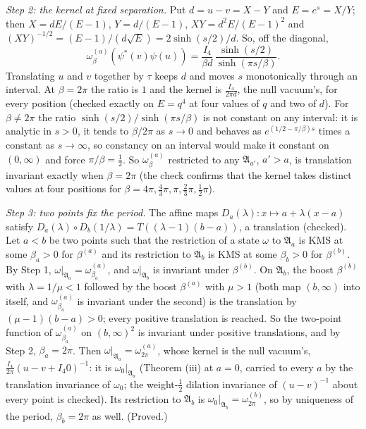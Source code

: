\emph{Step 2: the kernel at fixed separation.} Put $d = u - v = X - Y$ and $E = e^{s} = X/Y$; then $X = dE/(E - 1)$, $Y = d/(E - 1)$, $XY = d^{2}E/(E - 1)^{2}$ and $(XY)^{-1/2} = (E - 1)/(d\sqrt{E}) = 2\sinh(s/2)/d$. So, off the diagonal,
\[
\omega^{(a)}_{\beta}(\psi^{*}(v)\psi(u)) = \frac{I_{4}}{\beta d}\,\frac{\sinh(s/2)}{\sinh(\pi s/\beta)}.
\]
Translating $u$ and $v$ together by $\tau$ keeps $d$ and moves $s$ monotonically through an interval. At $\beta = 2\pi$ the ratio is $1$ and the kernel is $\tfrac{I_{4}}{2\pi d}$, the null vacuum's, for every position (checked exactly on $E = q^{4}$ at four values of $q$ and two of $d$). For $\beta \ne 2\pi$ the ratio $\sinh(s/2)/\sinh(\pi s/\beta)$ is not constant on any interval: it is analytic in $s > 0$, it tends to $\beta/2\pi$ as $s \to 0$ and behaves as $e^{(1/2 - \pi/\beta)s}$ times a constant as $s \to \infty$, so constancy on an interval would make it constant on $(0, \infty)$ and force $\pi/\beta = \tfrac12$. So $\omega^{(a)}_{\beta}$ restricted to any $\mathfrak{A}_{a'}$, $a' > a$, is translation invariant exactly when $\beta = 2\pi$ (the check confirms that the kernel takes distinct values at four positions for $\beta = 4\pi, \tfrac43\pi, \pi, \tfrac23\pi, \tfrac12\pi$).

\emph{Step 3: two points fix the period.} The affine maps $D_{a}(\lambda)\colon x \mapsto a + \lambda(x - a)$ satisfy $D_{a}(\lambda)\circ D_{b}(1/\lambda) = T((\lambda - 1)(b - a))$, a translation (checked). Let $a < b$ be two points such that the restriction of a state $\omega$ to $\mathfrak{A}_{a}$ is KMS at some $\beta_{a} > 0$ for $\beta^{(a)}$ and its restriction to $\mathfrak{A}_{b}$ is KMS at some $\beta_{b} > 0$ for $\beta^{(b)}$. By Step 1, $\omega|_{\mathfrak{A}_{a}} = \omega^{(a)}_{\beta_{a}}$, and $\omega|_{\mathfrak{A}_{b}}$ is invariant under $\beta^{(b)}$. On $\mathfrak{A}_{b}$, the boost $\beta^{(b)}$ with $\lambda = 1/\mu < 1$ followed by the boost $\beta^{(a)}$ with $\mu > 1$ (both map $(b, \infty)$ into itself, and $\omega^{(a)}_{\beta_{a}}$ is invariant under the second) is the translation by $(\mu - 1)(b - a) > 0$; every positive translation is reached. So the two-point function of $\omega^{(a)}_{\beta_{a}}$ on $(b, \infty)^{2}$ is invariant under positive translations, and by Step 2, $\beta_{a} = 2\pi$. Then $\omega|_{\mathfrak{A}_{a}} = \omega^{(a)}_{2\pi}$, whose kernel is the null vacuum's, $\tfrac{I_{4}}{2\pi}(u - v + I_{4}0)^{-1}$: it is $\omega_{0}|_{\mathfrak{A}_{a}}$ (Theorem (iii) at $a = 0$, carried to every $a$ by the translation invariance of $\omega_{0}$; the weight-$\tfrac12$ dilation invariance of $(u - v)^{-1}$ about every point is checked). Its restriction to $\mathfrak{A}_{b}$ is $\omega_{0}|_{\mathfrak{A}_{b}} = \omega^{(b)}_{2\pi}$, so by uniqueness of the period, $\beta_{b} = 2\pi$ as well. (Proved.)

